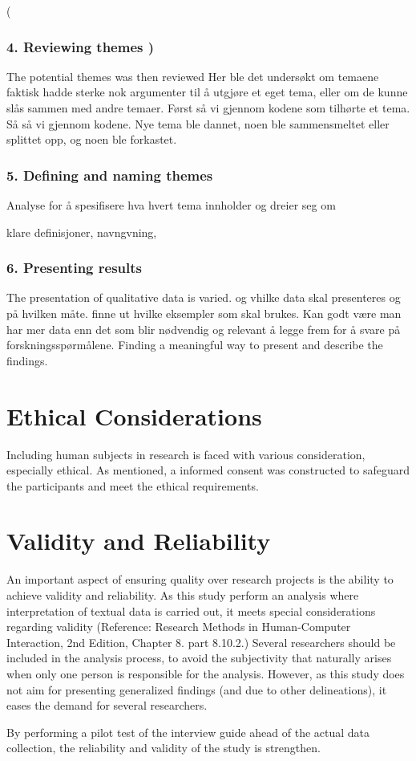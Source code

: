    ( \subsubsection{4. Reviewing themes )}
The potential themes was then reviewed 
Her ble det undersøkt om temaene faktisk hadde sterke nok argumenter til å utgjøre et eget tema, eller om de kunne slås sammen med andre temaer. 
Først så vi gjennom kodene som tilhørte et tema. Så så vi gjennom kodene. Nye tema ble dannet, noen ble sammensmeltet eller splittet opp, og noen ble forkastet. 

    \subsubsection{5. Defining and naming themes}
Analyse for å spesifisere hva hvert tema innholder og dreier seg om

klare definisjoner, navngvning, 
    
    \subsubsection{6. Presenting results}
    The presentation of qualitative data is varied. og vhilke data skal presenteres og på hvilken måte. finne ut hvilke eksempler som skal brukes. Kan godt være man har mer data enn det som blir nødvendig og relevant å legge frem for å svare på forskningsspørmålene. 
    Finding a meaningful way to present and describe the findings. 

\section{Ethical Considerations}
Including human subjects in research is faced with various consideration, especially ethical. As mentioned, a informed consent was constructed to safeguard the participants and meet the ethical requirements. 


\section{Validity and Reliability}

An important aspect of ensuring quality over research projects is the ability to achieve validity and reliability. As this study perform an analysis where interpretation of textual data is carried out, it meets special considerations regarding validity (Reference: Research Methods in Human-Computer Interaction, 2nd Edition, Chapter 8. part 8.10.2.) Several researchers should be included in the analysis process, to avoid the subjectivity that naturally arises when only one person is responsible for the analysis. However, as this study does not aim for presenting generalized findings (and due to other delineations), it eases the demand for several researchers. 

By performing a pilot test of the interview guide ahead of the actual data collection, the reliability and validity of the study is strengthen.






